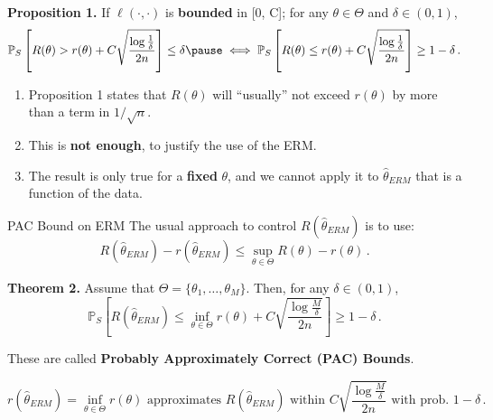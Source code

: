 \documentclass[aspectratio=159]{beamer}
\begin{document}
    \begin{frame}
        \textbf{Proposition 1.} If \(\ell(\cdot, \cdot)\) is \textbf{bounded} in [0, C]; for any \(\theta \in \Theta\) and \(\delta \in (0,1)\), 
        \[
            \mathbb{P}_{S}\left[ R(\theta) > r(\theta) + C\sqrt{\frac{\log \frac{1}{\delta}}{2n}} \right] \leq \delta  \pause \iff \mathbb{P}_{S}\left[ R(\theta) \leq r(\theta) + C\sqrt{\frac{\log \frac{1}{\delta}}{2n}} \right] \geq 1- \delta\,. 
        \]
        \pause
        \begin{enumerate}[<+->]
            \item Proposition 1 states that \(R(\theta)\) will ``usually'' not exceed \(r(\theta)\) by more than a term in \(1/\sqrt{n}\). 
            \item This is \textbf{not enough}, to justify the use of the ERM. 
            \item The result is only true for a \textbf{fixed} \(\theta\), and we cannot apply it to \(\hat{\theta}_{ERM}\) that is a function of the data.
        \end{enumerate}
    \end{frame}

    \begin{frame}{PAC Bound on ERM}
        The usual approach to control \(R(\hat{\theta}_{ERM})\) is to use:
        \[
        R(\hat{\theta}_{ERM}) - r(\hat{\theta}_{ERM}) \leq \sup_{\theta \in \Theta} R(\theta) - r(\theta)\,.
        \]

        \textbf{Theorem 2. }Assume that \(\Theta = \{\theta_1, \dots, \theta_M\}\). Then, for any \(\delta \in (0,1)\),
        \[
            \mathbb{P}_{S}\left[ R(\hat{\theta}_{ERM}) \leq \inf_{\theta \in \Theta} r(\theta) + C \sqrt{\frac{\log \tfrac{M}{\delta}}{2n}} \right] \geq 1- \delta\,.
        \]
        \pause
        \begin{center}
        These are called \textbf{Probably Approximately Correct (PAC) Bounds}.
        \end{center}
        \[
        r(\hat{\theta}_{ERM}) = \inf_{\theta \in \Theta} r(\theta) \text{ approximates } R(\hat{\theta}_{ERM}) \text{ within }C\sqrt{\frac{\log\tfrac{M}{\delta}}{2n}} \text{ with prob. } 1 - \delta\,.
        \]
    \end{frame}
\end{document}
